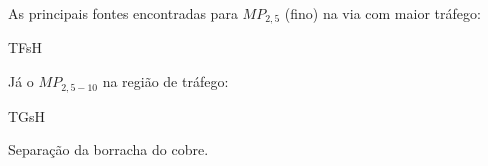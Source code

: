 As principais fontes encontradas para $MP_{2,5}$ (fino) na via
com maior tráfego:

\begin{table}[H]
  \centering
  
  \caption{TFsH}
\end{table}

Já o $MP_{2,5-10}$ na região de tráfego:

\begin{table}[H]
  \centering
  
  \caption{TGsH}
\end{table}

Separação da borracha do cobre.

%
%
%
%
